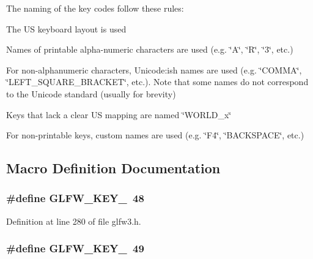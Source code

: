 The naming of the key codes follow these rules\-:
\begin{DoxyItemize}
\item The U\-S keyboard layout is used
\item Names of printable alpha-\/numeric characters are used (e.\-g. \char`\"{}\-A\char`\"{}, \char`\"{}\-R\char`\"{}, \char`\"{}3\char`\"{}, etc.)
\item For non-\/alphanumeric characters, Unicode\-:ish names are used (e.\-g. \char`\"{}\-C\-O\-M\-M\-A\char`\"{}, \char`\"{}\-L\-E\-F\-T\-\_\-\-S\-Q\-U\-A\-R\-E\-\_\-\-B\-R\-A\-C\-K\-E\-T\char`\"{}, etc.). Note that some names do not correspond to the Unicode standard (usually for brevity)
\item Keys that lack a clear U\-S mapping are named \char`\"{}\-W\-O\-R\-L\-D\-\_\-x\char`\"{}
\item For non-\/printable keys, custom names are used (e.\-g. \char`\"{}\-F4\char`\"{}, \char`\"{}\-B\-A\-C\-K\-S\-P\-A\-C\-E\char`\"{}, etc.) 
\end{DoxyItemize}

\subsection{Macro Definition Documentation}
\hypertarget{group__keys_ga50391730e9d7112ad4fd42d0bd1597c1}{
\subsubsection[{G\-L\-F\-W\-\_\-\-K\-E\-Y\-\_\-0}]{\setlength{\rightskip}{0pt plus 5cm}\#define G\-L\-F\-W\-\_\-\-K\-E\-Y\-\_~48}}\label{group__keys_ga50391730e9d7112ad4fd42d0bd1597c1}


Definition at line 280 of file glfw3.\-h.

\hypertarget{group__keys_ga05e4cae9ddb8d40cf6d82c8f11f2502f}{
\subsubsection[{G\-L\-F\-W\-\_\-\-K\-E\-Y\-\_\-1}]{\setlength{\rightskip}{0pt plus 5cm}\#define G\-L\-F\-W\-\_\-\-K\-E\-Y\-\_~49}}\label{group__keys_ga05e4cae9ddb8d40cf6d82c8f11f2502f}


